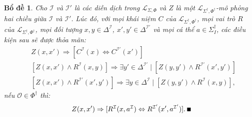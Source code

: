 \documentclass[12pt,a4paper,twoside]{report}
\newcommand{\mL}		{\mathcal{L}}
\newcommand{\mI}		{\mathcal{I}}
\newcommand{\mO}		{\mathcal{O}}
\newcommand{\SigmaDagI}	{\Sigma^\dag_I}
\newcommand{\PhiDag}	{\Phi^\dag}
\newcommand{\mLSP}		{\mL_{\Sigma,\Phi}}
\newcommand{\mLSPD}		{\mL_{\Sigma^\dag,\Phi^\dag}}
\newcommand{\myend}		{\mbox{}\hfill\mbox{{\scriptsize$\!\blacksquare$}}}
\newcommand{\E}			{\exists}
\newtheorem{Lemma}{Bổ đề}[chapter]
\theoremstyle{definition}
\begin{document}
\begin{Lemma}
\label{lm:Condition}
Cho $\mI$ và $\mI'$ là các diễn dịch trong $\mLSP$ và $Z$ là một $\mLSPD$-mô phỏng hai chiều giữa $\mI$ và $\mI'$. Lúc đó, với mọi khái niệm $C$ của $\mLSPD$, mọi vai trò $R$ của $\mLSPD$, mọi đối tượng $x, y \in \Delta^\mI$, $x', y' \in \Delta^{\mI'}$ và mọi cá thể $a \in \SigmaDagI$, các điều kiện sau sẽ được thỏa mãn:
\begin{eqnarray}
&& Z(x, x') \Rightarrow [C^\mI(x) \Leftrightarrow C^{\mI'}(x')] \label{bs:eqC3}\\
&& [Z(x, x') \wedge R^\mI(x, y)] \Rightarrow \E y' \in \Delta^{\mI'} \mid [Z(y,y') \wedge R^{\mI'}(x',y')] \label{bs:eqR1}\\
&& [Z(x, x') \wedge R^{\mI'}(x', y')] \Rightarrow \E y \in \Delta^\mI \mid [Z(y,y') \wedge R^\mI(x,y)], \label{bs:eqR2}
\end{eqnarray}
nếu $\mO \in \PhiDag$ thì:
\begin{eqnarray}
&& Z(x, x') \Rightarrow [R^\mI(x, a^\mI) \Leftrightarrow R^{\mI'}(x', a^{\mI'})].\label{bs:eqOR}\ \myend
\end{eqnarray}
\end{Lemma}
\end{document}
